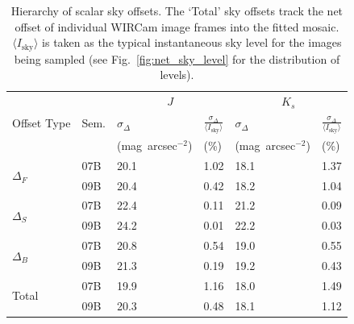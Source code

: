 \documentclass[iop]{emulateapj}
\newcommand{\Fig}[1]{Fig.~\ref{fig:#1}}  %
\begin{document}
\begin{table}[t]
\centering
\caption[Hierarchy of scalar sky offsets]{Hierarchy of scalar sky offsets. The `Total' sky offsets track the net offset of individual WIRCam image frames into the fitted mosaic. $\langle I_\mathrm{sky}\rangle$ is taken as the typical instantaneous sky level for the images being sampled (see \Fig{net_sky_level} for the distribution of levels).}
\label{tab:offset_hierarchy}
\begin{tabular}{ll|ll|ll}
&  & \multicolumn{2}{c|}{$J$} & \multicolumn{2}{c}{$K_s$} \\ %
Offset Type & Sem. & $\sigma_\Delta$ & $\frac{\sigma_\Delta}{\langle I_\mathrm{sky}\rangle }$ & $\sigma_\Delta$ & $\frac{\sigma_\Delta}{\langle I_\mathrm{sky}\rangle }$ \\
& & \tiny{(mag~arcsec$^{-2}$)} &  \tiny{(\%)} & \tiny{(mag~arcsec$^{-2}$)} &  \tiny{(\%)} \\
\hline
\multirow{2}{*}{$\Delta_F$} & 07B & 20.1 & 1.02 & 18.1 & 1.37 \\
& 09B  & 20.4 & 0.42 & 18.2 & 1.04 \\
\hline
\multirow{2}{*}{$\Delta_S$} & 07B & 22.4 & 0.11 & 21.2 & 0.09 \\
& 09B & 24.2 & 0.01 & 22.2 & 0.03\\
\hline
\multirow{2}{*}{$\Delta_B$} & 07B & 20.8 & 0.54 & 19.0 & 0.55 \\
& 09B & 21.3 & 0.19 & 19.2 & 0.43 \\
\hline
\multirow{2}{*}{Total} & 07B & 19.9 & 1.16 & 18.0 & 1.49 \\
& 09B & 20.3 & 0.48 & 18.1 & 1.12 \\
\end{tabular}
\end{table}

% 
% 
% 
% 
% 
% 
\end{document}
